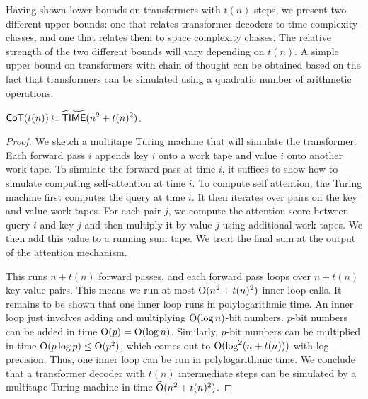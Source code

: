 \documentclass{article} %
\begin{document}
Having shown lower bounds on transformers with $t(n)$ steps,
we present two different upper bounds: one that relates transformer decoders to time complexity classes, and one that relates them to space complexity classes. The relative strength of the two different bounds will vary depending on $t(n)$.
% 
% 
A simple upper bound on transformers with chain of thought can be obtained based on the fact that transformers can be simulated using a quadratic number of arithmetic operations.

\begin{theorem} \label{sec:naive-upper-bound}
    $\mathsf{CoT}(t(n)) \subseteq \widetilde{\mathsf{TIME}}(n^2 + t(n)^2)$.
\end{theorem}
\begin{proof}
We sketch a multitape Turing machine that will simulate the transformer. Each forward pass $i$ appends key $i$ onto a work tape and value $i$ onto another work tape. To simulate the forward pass at time $i$, it suffices to show how to simulate computing self-attention at time $i$.
% 
To compute self attention, the Turing machine first computes the query at time $i$. It then iterates over pairs on the key and value work tapes. For each pair $j$, we compute the attention score between query $i$ and key $j$ and then multiply it by value $j$ using additional work tapes. We then add this value to a running sum tape.
We treat the final sum at the output of the attention mechanism.

This runs $n + t(n)$ forward passes, and each forward pass loops over $n + t(n)$ key-value pairs. This means we run at most $\mathrm{O}(n^2 + t(n)^2)$ inner loop calls.
It remains to be shown that one inner loop runs in polylogarithmic time.
An inner loop just involves adding and multiplying $\mathrm{O}(\log n)$-bit numbers.
$p$-bit numbers can be added in time $\mathrm{O}(p) = \mathrm{O}(\log n)$.
Similarly, $p$-bit numbers can be multiplied in time $\mathrm{O}(p \log p) \leq \mathrm{O}(p^2)$, which comes out to $\mathrm{O}(\log^2 (n + t(n)))$ with log precision.
Thus, one inner loop can be run in polylogarithmic time.
We conclude that a transformer decoder with $t(n)$ intermediate steps can be simulated by a multitape Turing machine in time $\widetilde{\mathrm{O}}(n^2 + t(n)^2)$.
\end{proof}
\end{document}
